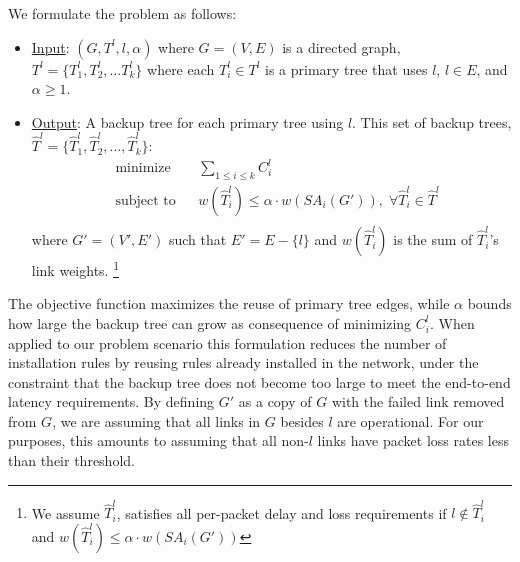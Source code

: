 We formulate the \mc problem as follows: 
\begin{itemize}

	\item  \underline{Input}: $(G,T^l,l,\alpha)$ where $G=(V,E)$ is a directed graph, $T^l=\{T_1^l,T_2^l, \dots T_k^l\}$ where each $T_i^l \in T^l$ is a primary tree that uses $l$, 
	$l \in E$, and $\alpha \geq 1$. 


	\item \underline{Output}: A backup tree for each primary tree using $l$. This set of backup trees, $\hat{T}^l = \{\hat{T}^l_1,\hat{T}^l_2,\dots,\hat{T}^l_k\}$:
		\begin{equation}
		\label{eqn:mc-obj-function}
		\begin{aligned}
			& {\text{minimize}}
			& & \sum_{1 \leq i \leq k} C^l_i \\
			& \text{subject to}
			& & w(\hat{T}^l_i) \leq \alpha \cdot w(SA_i(G')), \;  \forall \hat{T}^l_i \in \hat{T}^l \\
		\end{aligned}
		\end{equation}
		where $G'=(V',E')$ such that $E' = E - \{l\}$ and $w(\hat{T}^l_i)$ is the sum of $\hat{T}^l_i$'s link weights.	
		\footnote{We assume $\hat{T}^l_i$, satisfies all per-packet delay and loss requirements if $l \notin \hat{T}^l_i$ and $w(\hat{T}^l_i) \leq \alpha \cdot w(SA_i(G'))$}

\end{itemize}   %
The objective function maximizes the reuse of primary tree edges, while $\alpha$ bounds how large the backup tree can grow as consequence of minimizing $C^l_i$.  When applied to our
problem scenario this formulation reduces the number of installation rules by reusing rules already installed in the network, under the constraint that the 
backup tree does not become too large to meet the end-to-end latency requirements. 
By defining $G'$ as a copy of $G$ with the failed link removed from $G$, we are assuming that all links in $G$ besides $l$ are operational.  For
our purposes, this amounts to assuming that all non-$l$ links have packet loss rates less than their threshold. %

